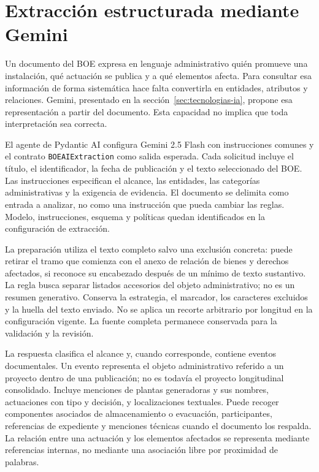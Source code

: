 \section{Extracción estructurada mediante Gemini}
\label{sec:extraccion-gemini}
Un documento del BOE expresa en lenguaje administrativo quién promueve una
instalación, qué actuación se publica y a qué elementos afecta. Para consultar
esa información de forma sistemática hace falta convertirla en entidades,
atributos y relaciones. Gemini, presentado en la
sección~\ref{sec:tecnologias-ia}, propone esa representación a partir del
documento. Esta capacidad no implica que toda interpretación sea correcta.

El agente de Pydantic AI configura Gemini 2.5 Flash con instrucciones comunes
y el contrato \texttt{BOEAIExtraction} como salida esperada. Cada solicitud
incluye el título, el identificador, la fecha de publicación y el texto
seleccionado del BOE. Las instrucciones especifican el alcance, las entidades,
las categorías administrativas y la exigencia de evidencia. El documento se
delimita como entrada a analizar, no como una instrucción que pueda cambiar las
reglas. Modelo, instrucciones, esquema y políticas quedan identificados en la
configuración de extracción.

La preparación utiliza el texto completo salvo una exclusión concreta: puede
retirar el tramo que comienza con el anexo de relación de bienes y derechos
afectados, si reconoce su encabezado después de un mínimo de texto sustantivo.
La regla busca separar listados accesorios del objeto administrativo; no es
un resumen generativo. Conserva la estrategia, el marcador, los caracteres
excluidos y la huella del texto enviado. No se aplica un recorte arbitrario
por longitud en la configuración vigente. La fuente completa permanece
conservada para la validación y la revisión.

La respuesta clasifica el alcance y, cuando corresponde, contiene eventos
documentales. Un evento representa el objeto administrativo referido a un
proyecto dentro de una publicación; no es todavía el proyecto longitudinal
consolidado. Incluye menciones de plantas generadoras y sus nombres,
actuaciones con tipo y decisión, y localizaciones textuales. Puede recoger
componentes asociados de almacenamiento o evacuación, participantes,
referencias de expediente y menciones técnicas cuando el documento los
respalda. La relación entre una actuación y los elementos afectados se
representa mediante referencias internas, no mediante una asociación libre
por proximidad de palabras.

